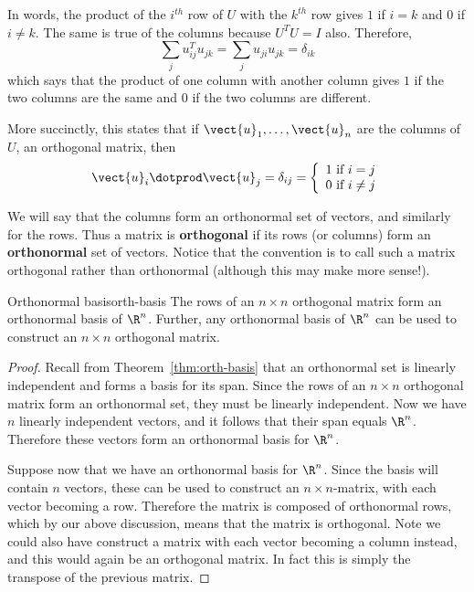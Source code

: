 In words, the product of the $i^{th}$ row of $U$ with the $k^{th}$ row
gives $1$ if $i=k$ and $0$ if $i\neq k$. The same is true of the columns because 
$U^{T}U=I$ also. Therefore, 
\begin{equation*}
\sum_{j}u_{ij}^{T}u_{jk}=\sum_{j}u_{ji}u_{jk}=\delta _{ik}
\end{equation*}
which says that the product of one column with another column gives $1$ if the two
columns are the same and $0$ if the two columns are different.

More succinctly, this states that if $\vect{u}_{1},\ldots,\vect{u}_{n}$
are the columns of $U$, an orthogonal matrix, then 
\[
\vect{u}_{i}\dotprod \vect{u}_{j}=\delta _{ij} = \left\{
\begin{array}{c}
1\text{ if }i=j \\ 
0\text{ if }i\neq j
\end{array}
\right.  
\]

We will say that the columns form an orthonormal set of vectors, and similarly for the rows. Thus a matrix is \textbf{orthogonal} if its rows (or columns) form an
\textbf{orthonormal} set of vectors. Notice that the convention is to call such a matrix orthogonal rather than orthonormal (although this may make more sense!). 

\begin{proposition}{Orthonormal basis}{orth-basis}
The rows of an $n \times n$ orthogonal matrix form an orthonormal
basis of $\R^n$. Further, any orthonormal basis of
$\R^n$ can be used to construct an $n \times n$ orthogonal
matrix.
\end{proposition}

\begin{proof}
Recall from Theorem~\ref{thm:orth-basis} that an orthonormal set is
linearly independent and forms a basis for its span. Since the rows of
an $n \times n$ orthogonal matrix form an orthonormal set, they must
be linearly independent. Now we have $n$ linearly independent vectors,
and it follows that their span equals $\R^n$. Therefore these
vectors form an orthonormal basis for $\R^n$.

Suppose now that we have an orthonormal basis for $\R^n$. Since the
basis will contain $n$ vectors, these can be used to construct an $n
\times n$-matrix, with each vector becoming a row. Therefore the
matrix is composed of orthonormal rows, which by our above discussion,
means that the matrix is orthogonal. Note we could also have construct
a matrix with each vector becoming a column instead, and this would
again be an orthogonal matrix. In fact this is simply the transpose of
the previous matrix.
\end{proof}

